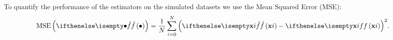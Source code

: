 To quantify the performance of the estimators on the simulated datasets we use the Mean Squared Error (MSE):
\begin{equation*}
	\varMSE{\varEstimatedDensityFunction{\bullet}} = \frac{1}{\varNumPatterns} \sum_{i = 0}^{\varNumPatterns} {\left(\varEstimatedDensityFunction{\varPattern{i}} - \varDensityFunction{\varPattern{i}} \right)}^2.
\end{equation*}
